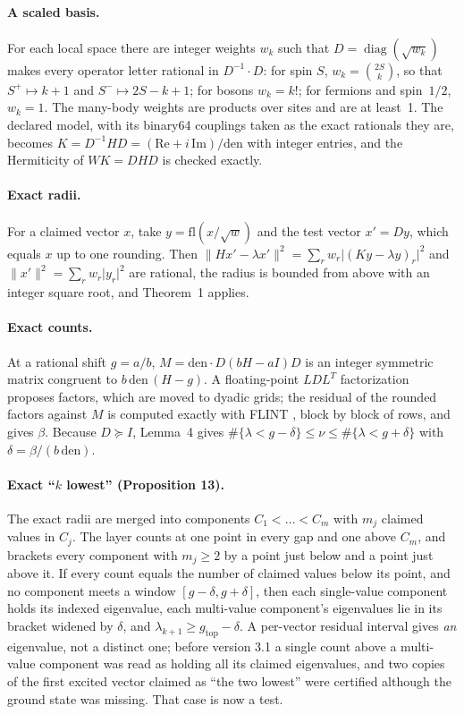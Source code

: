 \documentclass[11pt,a4paper]{article}
\newcommand{\fl}{\mathrm{fl}}
\newcommand{\norm}[1]{\lVert #1\rVert}
\newcommand{\abs}[1]{\lvert #1\rvert}
\begin{document}
\paragraph{A scaled basis.}
For each local space there are integer weights $w_k$ such that $D=\operatorname{diag}(\sqrt{w_k})$ makes every operator
letter rational in $D^{-1}\cdot D$: for spin $S$, $w_k=\binom{2S}{k}$, so that $S^+\mapsto k+1$ and $S^-\mapsto2S-k+1$;
for bosons $w_k=k!$; for fermions and spin~$1/2$, $w_k=1$. The many-body weights are products over sites and are at
least~1. The declared model, with its binary64 couplings taken as the exact rationals they are, becomes
$K=D^{-1}HD=(\mathrm{Re}+i\,\mathrm{Im})/\mathrm{den}$ with integer entries, and the Hermiticity of $WK=DHD$ is checked
exactly.

\paragraph{Exact radii.}
For a claimed vector $x$, take $y=\fl(x/\sqrt{w})$ and the test vector $x'=Dy$, which equals $x$ up to one rounding.
Then $\norm{Hx'-\lambda x'}^2=\sum_rw_r\abs{(Ky-\lambda y)_r}^2$ and $\norm{x'}^2=\sum_rw_r\abs{y_r}^2$ are rational,
the radius is bounded from above with an integer square root, and Theorem~1 applies.

\paragraph{Exact counts.}
At a rational shift $g=a/b$, $M=\mathrm{den}\cdot D(bH-aI)D$ is an integer symmetric matrix congruent to
$b\,\mathrm{den}\,(H-g)$. A floating-point $LDL^T$ factorization proposes factors, which are moved to dyadic grids; the
residual of the rounded factors against $M$ is computed exactly with FLINT \cite{FLINT}, block by block of rows, and
gives $\beta$. Because $D\succeq I$, Lemma~4 gives $\#\{\lambda<g-\delta\}\le\nu\le\#\{\lambda<g+\delta\}$ with
$\delta=\beta/(b\,\mathrm{den})$.

\paragraph{Exact ``$k$ lowest'' (Proposition 13).}
The exact radii are merged into components $C_1<\dots<C_m$ with $m_j$ claimed values in $C_j$. The layer counts at
one point in every gap and one above $C_m$, and brackets every component with $m_j\ge2$ by a point just below and a
point just above it. If every count equals the number of claimed values below its point, and no component meets a
window $[g-\delta,g+\delta]$, then each single-value component holds its indexed eigenvalue, each multi-value
component's eigenvalues lie in its bracket widened by $\delta$, and $\lambda_{k+1}\ge g_{\mathrm{top}}-\delta$. A
per-vector residual interval gives \emph{an} eigenvalue, not a distinct one; before version 3.1 a single count above a
multi-value component was read as holding all its claimed eigenvalues, and two copies of the first excited vector
claimed as ``the two lowest'' were certified although the ground state was missing. That case is now a test.
\end{document}
